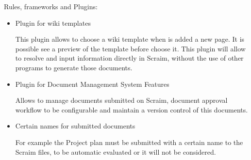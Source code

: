 Rules, frameworks and Plugins:
\begin{itemize}
	\item Plugin for wiki templates
	
	This plugin allows to choose a wiki template when is added a new page. It is possible see a preview of the template before choose it.
	This plugin will allow to resolve and input information directly in Scraim, without the use of other programs to generate those documents.
	
	\item Plugin for Document Management System Features
	
	Allows to manage documents submitted on Scraim, document approval workflow to be configurable and maintain a version control of this documents.
	
	\item Certain names for submitted documents
	
	For example the Project plan must be submitted with a certain name to the Scraim files, to be automatic evaluated or it will not be considered.
	
\end{itemize}